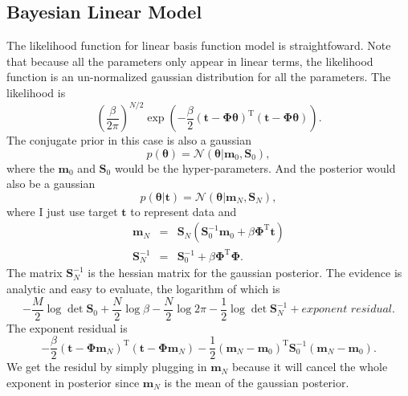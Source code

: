 \subsection{Bayesian Linear Model}
The likelihood function for linear basis function model is straightfoward. Note that because all the parameters only appear in linear terms, the likelihood function is an un-normalized gaussian distribution for all the parameters. The likelihood is
\begin{equation}
\left(\frac{\beta}{2\pi}\right)^{N/2}\exp{\left(-\frac{\beta}{2}(\mathbf{t}-\mathbf{\Phi}\boldsymbol{\theta})^\mathrm{T}(\mathbf{t}-\mathbf{\Phi}\boldsymbol{\theta})\right)}.
\end{equation}
The conjugate prior in this case is also a gaussian
\begin{equation}
p(\boldsymbol{\theta})=\mathcal{N}(\boldsymbol{\theta}|\mathbf{m}_0,\mathbf{S}_0),
\end{equation}
where the $\mathbf{m}_0$ and $\mathbf{S}_0$ would be the hyper-parameters. And the posterior would also be a gaussian
\begin{equation}
p(\boldsymbol{\theta}|\mathbf{t})=\mathcal{N}(\boldsymbol{\theta}|\mathbf{m}_N,\mathbf{S}_N),
\end{equation}
where I just use target $\mathbf{t}$ to represent data and
\begin{eqnarray}
\mathbf{m}_N & = & \mathbf{S}_N(\mathbf{S}_0^{-1}\mathbf{m}_0+\beta\mathbf{\Phi}^\mathrm{T}\mathbf{t})\\
\mathbf{S}_N^{-1} & = & \mathbf{S}_0^{-1}+\beta\mathbf{\Phi}^\mathrm{T}\mathbf{\Phi}.
\end{eqnarray}
The matrix $\mathbf{S}_N^{-1}$ is the hessian matrix for the gaussian posterior. The evidence is analytic and easy to evaluate, the logarithm of which is
\begin{equation}
-\frac{M}{2}\log{\det{\mathbf{S}_0}}+\frac{N}{2}\log\beta-\frac{N}{2}\log2\pi-\frac{1}{2}\log{\det{\mathbf{S}_N^{-1}}}+exponent\,\,residual.
\end{equation}
The exponent residual is
\begin{equation}
-\frac{\beta}{2}(\mathbf{t}-\mathbf{\Phi}\mathbf{m}_N)^\mathrm{T}(\mathbf{t}-\mathbf{\Phi}\mathbf{m}_N)-\frac{1}{2}(\mathbf{m}_N-\mathbf{m}_0)^\mathrm{T}\mathbf{S}_0^{-1}(\mathbf{m}_N-\mathbf{m}_0).
\end{equation}
We get the residul by simply plugging in $\mathbf{m}_N$ because it will cancel the whole exponent in posterior since $\mathbf{m}_N$ is the mean of the gaussian posterior.


